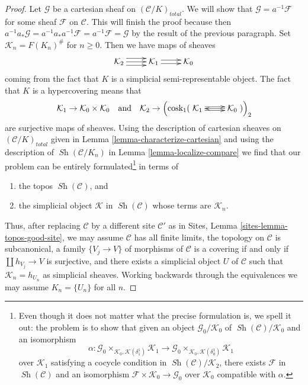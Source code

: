 \documentclass{stacks-project}
\theoremstyle{plain}
\theoremstyle{definition}
\theoremstyle{remark}
\numberwithin{equation}{subsection}
\def\Sh{\mathop{\mathit{Sh}}\nolimits}
\begin{document}
\begin{proof}
\medskip\noindent
Let $\mathcal{G}$ be a cartesian sheaf on $(\mathcal{C}/K)_{total}$.
We will show that $\mathcal{G} = a^{-1}\mathcal{F}$ for some sheaf
$\mathcal{F}$ on $\mathcal{C}$. This will finish the proof because
then $a^{-1}a_*\mathcal{G} = a^{-1}a_*a^{-1}\mathcal{F} =
a^{-1}\mathcal{F} = \mathcal{G}$ by the result of the previous paragraph.
Set $\mathcal{K}_n = F(K_n)^\#$ for $n \geq 0$. Then we have maps of sheaves
$$
\xymatrix{
\mathcal{K}_2
\ar@<1ex>[r]
\ar@<0ex>[r]
\ar@<-1ex>[r]
&
\mathcal{K}_1
\ar@<0.5ex>[r]
\ar@<-0.5ex>[r]
&
\mathcal{K}_0
}
$$
coming from the fact that $K$ is a simplicial semi-representable object.
The fact that $K$ is a hypercovering means that
$$
\mathcal{K}_1 \to \mathcal{K}_0 \times \mathcal{K}_0
\quad\text{and}\quad
\mathcal{K}_2 \to
\left(\text{cosk}_1(
\xymatrix{
\mathcal{K}_1
\ar@<0.5ex>[r]
\ar@<-0.5ex>[r]
&
\mathcal{K}_0 \ar[l]
})\right)_2
$$
are surjective maps of sheaves. Using the description of cartesian sheaves on
$(\mathcal{C}/K)_{total}$ given in Lemma \ref{lemma-characterize-cartesian}
and using the description of $\Sh(\mathcal{C}/K_n)$ in
Lemma \ref{lemma-localize-compare}
we find that our problem can be entirely formulated\footnote{Even though it
does not matter what the precise formulation is, we spell it out:
the problem is to show that given an object
$\mathcal{G}_0/\mathcal{K}_0$ of $\Sh(\mathcal{C})/\mathcal{K}_0$
and an isomorphism
$$
\alpha :
\mathcal{G}_0 \times_{\mathcal{K}_0, \mathcal{K}(\delta^1_1)} \mathcal{K}_1 \to
\mathcal{G}_0 \times_{\mathcal{K}_0, \mathcal{K}(\delta^1_0)} \mathcal{K}_1
$$
over $\mathcal{K}_1$ satisfying a cocycle condition in
$\Sh(\mathcal{C})/\mathcal{K}_2$, there exists
$\mathcal{F}$ in $\Sh(\mathcal{C})$ and an isomorphism
$\mathcal{F} \times \mathcal{K}_0 \to \mathcal{G}_0$ over $\mathcal{K}_0$
compatible with $\alpha$.} in terms of
\begin{enumerate}
\item the topos $\Sh(\mathcal{C})$, and
\item the simplicial object $\mathcal{K}$ in $\Sh(\mathcal{C})$
whose terms are $\mathcal{K}_n$.
\end{enumerate}
Thus, after replacing $\mathcal{C}$ by a different site $\mathcal{C}'$
as in Sites, Lemma \ref{sites-lemma-topos-good-site}, we may assume
$\mathcal{C}$ has all finite limits,
the topology on $\mathcal{C}$ is subcanonical,
a family $\{V_j \to V\}$ of morphisms of $\mathcal{C}$
is a covering if and only if $\coprod h_{V_j} \to V$ is surjective, and
there exists a simplicial object $U$ of $\mathcal{C}$
such that $\mathcal{K}_n = h_{U_n}$ as simplicial sheaves.
Working backwards through the equivalences we may assume
$K_n = \{U_n\}$ for all $n$.


\end{proof}
\end{document}
